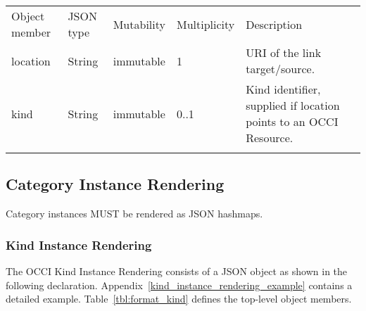 \documentclass[10pt,a4paper]{article}
\begin{document}
 {
    \begin{tabularx}{\textwidth}{llllX}
    \toprule
    Object member & JSON type         & Mutability  & Multiplicity  & Description \\
    \colrule
    location      & String            & immutable   & 1             & URI of the link target/source. \\

    kind          & String            & immutable   & 0..1          & Kind identifier, supplied if location points to an OCCI Resource. \\
    \botrule
    \end{tabularx}
}

\subsection{Category Instance Rendering}
\label{sec:format_category_instance_rendering}
Category instances MUST be rendered as JSON hashmaps.

\subsubsection{Kind Instance Rendering}
\label{sec:format_kind}

The OCCI Kind Instance Rendering consists of a JSON object as shown in the
following declaration. Appendix~\ref{kind_instance_rendering_example} contains a detailed example.
Table~\ref{tbl:format_kind} defines the top-level object members.
\end{document}
